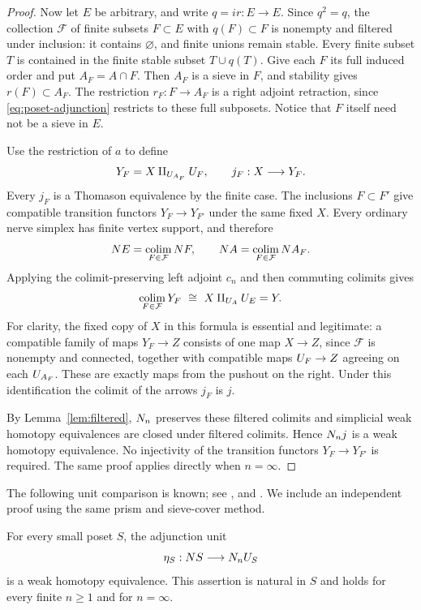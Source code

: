 \begin{proof}
Now let $E$ be arbitrary, and write $q=ir:E\to E$.  Since
$q^2=q$, the collection $\mathcal F$ of finite subsets $F\subset E$
with $q(F)\subset F$ is nonempty and filtered under inclusion: it
contains $\varnothing$, and finite unions remain stable.  Every
finite subset $T$ is contained in the finite stable subset
$T\cup q(T)$.  Give each $F$ its full induced order and put
$A_F=A\cap F$.  Then $A_F$ is a sieve in $F$, and stability gives
$r(F)\subset A_F$.  The restriction $r_F:F\to A_F$ is a right
adjoint retraction, since \eqref{eq:poset-adjunction} restricts to
these full subposets.  Notice that $F$ itself need not be a sieve
in $E$.

Use the restriction of $a$ to define
\[
 Y_F=X\amalg_{U_{A_F}}U_{F},\qquad j_F:X\longrightarrow Y_F.
\]
Every $j_F$ is a Thomason equivalence by the finite case.  The
inclusions $F\subset F'$ give compatible transition functors
$Y_F\to Y_{F'}$ under the same fixed $X$.  Every ordinary nerve
simplex has finite vertex support, and therefore
\[
 N E=\operatorname*{colim}_{F\in\mathcal F}N F,
 \qquad
 N A=\operatorname*{colim}_{F\in\mathcal F}N A_F.
\]
Applying the colimit-preserving left adjoint $c_n$ and then commuting
colimits gives
\begin{equation}\label{eq:couniversal-filtered-colimit}
 \operatorname*{colim}_{F\in\mathcal F}Y_F
 \ \cong\ X\amalg_{U_{A}}U_{E}=Y.
\end{equation}
For clarity, the fixed copy of $X$ in this formula is essential and
legitimate: a compatible family of maps $Y_F\to Z$ consists of one
map $X\to Z$, since $\mathcal F$ is nonempty and connected, together
with compatible maps $U_{F}\to Z$ agreeing on each $U_{A_F}$.
These are exactly maps from the pushout on the right.  Under this
identification the colimit of the arrows $j_F$ is $j$.

By Lemma~\ref{lem:filtered}, $N_n$ preserves these filtered
colimits and simplicial weak homotopy equivalences are closed under
filtered colimits.  Hence $N_n j$ is a weak homotopy equivalence.
No injectivity of the transition functors $Y_F\to Y_{F'}$ is
required.  The same proof applies directly when $n=\infty$.
\end{proof}

The following unit comparison is known; see
\cite[Corollary~10.11]{AraMaltsiniotis2015},
\cite[Theorem~6.9]{Gagna2018} and
\cite[Proposition~9.2.3]{Ara2023}. We include an independent proof
using the same prism and sieve-cover method.

\begin{proposition}\label{prop:poset-unit}
For every small poset $S$, the adjunction unit
\[
 \eta_S:N S\longrightarrow N_nU_{S}
\]
is a weak homotopy equivalence.  This assertion is natural in $S$
and holds for every finite $n\ge1$ and for $n=\infty$.
\end{proposition}

